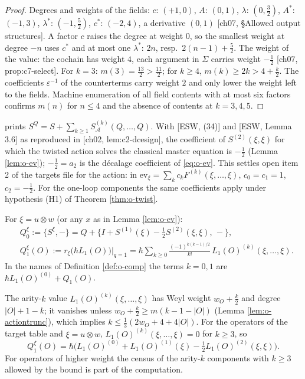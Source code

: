 \begin{proof}
Degrees and weights of the fields: $c$: $(+1,0)$, $A$: $(0,1)$, $\lambda$: $(0,\tfrac32)$, $A^*$: $(-1,3)$, $\lambda^*$: $(-1,\tfrac52)$, $c^*$: $(-2,4)$, a derivative $(0,1)$ [ch07, §Allowed output structures]. A factor $c$ raises the degree at weight $0$, so the smallest weight at degree $-n$ uses $c^*$ and at most one $\lambda^*$: $2n$, resp.\ $2(n-1)+\tfrac52$. The weight of the value: the cochain has weight $4$, each argument in $\Sigma$ carries weight $-\tfrac12$ [ch07, prop:c7-select]. For $k=3$: $m(3)=\tfrac{13}{2}>\tfrac{11}2$; for $k\ge4$, $m(k)\ge2k>4+\tfrac k2$. The coefficients $\varepsilon^{-1}$ of the counterterms carry weight $2$ and only lower the weight left to the fields. Machine enumeration of all field contents with at most six factors confirms $m(n)$ for $n\le4$ and the absence of contents at $k=3,4,5$.
\end{proof}

\begin{remark} prints $S^Q=S+\sum_{k\ge1}S^{(k)}_{\mathcal A}(Q,\dots,Q)$. With [ESW, (34)] and [ESW, Lemma 3.6] as reproduced in [ch02, lem:c2-dcesign], the coefficient of $S^{(2)}(\xi,\xi)$ for which the twisted action solves the classical master equation is $-\tfrac12$ (Lemma \ref{lem:o-ev}); $-\tfrac12=a_2$ is the décalage coefficient of \eqref{eq:o-ev}. This settles open item 2 of the targets file for the action: in $\mathrm{ev}_\xi=\sum_kc_kF^{(k)}(\xi,\dots,\xi)$, $c_0=c_1=1$, $c_2=-\tfrac12$. For the one-loop components the same coefficients apply under hypothesis (H1) of Theorem \ref{thm:o-twist}.
\end{remark}

\begin{definition}
\label{def:o-twisted}
For $\xi=u\otimes w$ (or any $x$ as in Lemma \ref{lem:o-ev}):
\[
\begin{aligned}
&Q_0^\xi:=\{S^\xi,-\}=Q+\big\{I+S^{(1)}(\xi)-\tfrac12S^{(2)}(\xi,\xi),\,-\big\},\\
&Q_1^\xi(O):=r_\xi\big(\hbar L_1(O)\big)\big|_{q=1}=\hbar\sum_{k\ge0}\frac{(-1)^{k(k-1)/2}}{k!}\,L_1(O)^{(k)}(\xi,\dots,\xi).
\end{aligned}
\]
In the names of Definition \ref{def:o-comp} the terms $k=0,1$ are $\hbar L_1(O)^{(0)}+Q_1(O)$.
\end{definition}

\begin{proposition}
\label{prop:o-trunc}
The arity-$k$ value $L_1(O)^{(k)}(\xi,\dots,\xi)$ has Weyl weight $w_O+\tfrac k2$ and degree $|O|+1-k$; it vanishes unless $w_O+\tfrac k2\ge m(k-1-|O|)$ (Lemma \ref{lem:o-actiontrunc}), which implies $k\le\tfrac13(2w_O+4+4|O|)$. For the operators of the target table and $\xi=u\otimes w$, $L_1(O)^{(k)}(\xi,\dots,\xi)=0$ for $k\ge3$, so
\[
Q_1^\xi(O)=\hbar\Big(L_1(O)^{(0)}+L_1(O)^{(1)}(\xi)-\tfrac12L_1(O)^{(2)}(\xi,\xi)\Big).
\]
For operators of higher weight the census of the arity-$k$ components with $k\ge3$ allowed by the bound is part of the computation.
\end{proposition}

